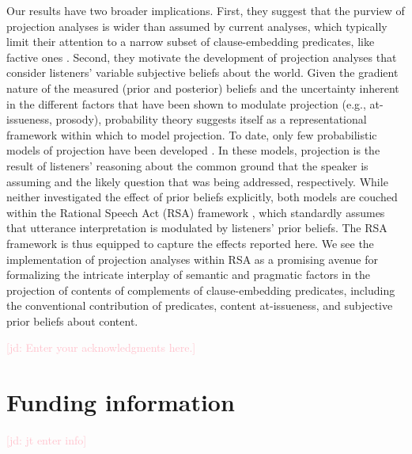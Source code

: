 \documentclass[OpenMind]{stjour}
\newcommand{\jd}[1]{\textcolor{Pink}{[jd: #1]}}
\begin{document}
Our results have two broader implications. First, they suggest that the purview of projection analyses is wider than assumed by current analyses, which typically limit their attention to a narrow subset of clause-embedding predicates, like factive ones \citep[e.g.,][]{heim83,vds92,abrusan2011,abrusan2016,romoli2015,best-question}. Second, they motivate the development of projection analyses that consider listeners' variable subjective beliefs about the world. Given the gradient nature of the measured (prior and posterior) beliefs and the uncertainty inherent in the different factors that have been shown to modulate projection (e.g., at-issueness, prosody), probability theory suggests itself as a representational framework within which to model projection. To date, only few probabilistic models of  projection have been developed \citep{qing2016, stevens-etal2017}. In these models, projection is the result of listeners' reasoning about the common ground that the speaker is assuming and the likely question that was being addressed, respectively. While neither investigated the effect of prior beliefs explicitly, both models are couched within the Rational Speech Act (RSA) framework \citep{frankejaeger2016,GoodmanFrank2016}, which standardly assumes that utterance interpretation is modulated by listeners' prior beliefs. The RSA framework is thus equipped to capture the effects reported here. We see the implementation of projection analyses within RSA as a promising avenue for formalizing the intricate interplay of semantic and pragmatic factors in the projection of contents of complements of clause-embedding predicates, including the conventional contribution of predicates, content at-issueness, and subjective prior beliefs about content.



\acknowledgments
\jd{Enter your acknowledgments here.}

\section{Funding information}

\jd{jt enter info}

\end{document}
